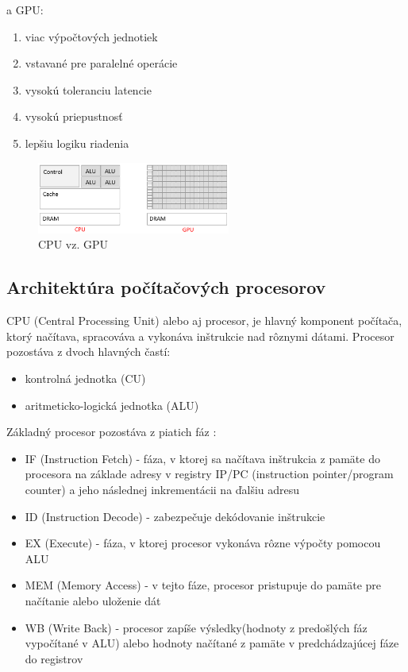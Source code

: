 \documentclass[conference]{IEEEtran}
\begin{document}
a GPU:

\begin{enumerate}
	\item{viac výpočtových jednotiek}
	\item{vstavané pre paralelné operácie}
	\item{vysokú toleranciu latencie}
	\item{vysokú priepustnosť}
	\item{lepšiu logiku riadenia}
\end{enumerate}


\begin{figure}[!h]
\centering
\includegraphics[width=2.5in]{img/CPU-GPU-3}
\caption{CPU vz. GPU}
\end{figure}


\subsection{Architektúra počítačových procesorov}

CPU (Central Processing Unit) alebo aj procesor, je hlavný komponent počítača, ktorý načítava, spracováva a vykonáva inštrukcie nad rôznymi dátami. Procesor pozostáva z dvoch hlavných častí:

\begin{itemize}
	\item{kontrolná jednotka (CU)}
	\item{aritmeticko-logická jednotka (ALU)}
\end{itemize}

Základný procesor pozostáva z piatich fáz \cite{hennessy2007compute}: 

\begin{itemize}
	\item{IF (Instruction Fetch) - fáza, v ktorej sa načítava inštrukcia z pamäte do procesora na základe adresy v registry IP/PC (instruction pointer/program counter) a jeho následnej inkrementácii na ďalšiu adresu }
	\item{ID (Instruction Decode) - zabezpečuje dekódovanie inštrukcie}
	\item{EX (Execute) - fáza, v ktorej procesor vykonáva rôzne výpočty pomocou ALU}
	\item{MEM (Memory Access) - v tejto fáze, procesor pristupuje do pamäte pre načítanie alebo uloženie dát}
	\item{WB (Write Back) - procesor zapíše výsledky(hodnoty z predošlých fáz vypočítané v ALU) alebo hodnoty načítané z pamäte v predchádzajúcej fáze do registrov}
\end{itemize}
\end{document}

